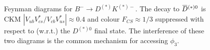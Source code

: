 \documentclass[oneside,12pt]{article}
\newcommand{\overbar}[1]{\mkern 1.5mu\overline{\mkern-1.5mu#1\mkern-1.5mu}\mkern
1.5mu}
\begin{document}
\begin{figure}[htp]
  \vspace*{-7mm}
  \centering
  \caption{{Feynman diagrams for ${B}^{-}\rightarrow{D}^{(*)}{K}^{(*)-}$}.
    The decay to $\overbar{{D}}^{(*)0}$ is CKM
    $|V_{ub}V^{*}_{cs}/V_{cb}V^{*}_{us}|\approx0.4$ and colour ${F}_{CS}\approx1/3$
    suppressed with respect to (w.r.t.) the ${D}^{(*)0}$ final state. The
    interference of these two diagrams is the common mechanism for accessing
  $\phi_3$.}
  \label{fig:B2DstarKstar}
  \vspace{-10pt}
\end{figure}
\end{document}
